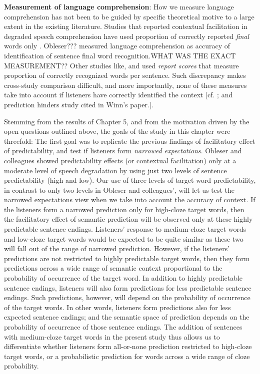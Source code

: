 \documentclass[a4paper, nobind]{templates/ociamthesis}
\begin{document}
\textbf{Measurement of language comprehension}:
How we measure language comprehension has not been to be guided by specific theoretical motive to a large extent in the existing literature.
Studies that reported contextual facilitation in degraded speech comprehension have used proportion of correctly reported \emph{final} words only \autocite[e.g.,][]{Sheldon2008a}.
Obleser??? measured language comprehension as accuracy of identification of sentence final word recognition.WHAT WAS THE EXACT MEASUREMENT??
Other studies like, \textcite{Erb2013} and \textcite{Hakonen2017} used \emph{report scores} \autocite{Peelle2013} that measure proportion of correctly recognized words per sentence.
Such discrepancy makes cross-study comparison difficult,
and more importantly, none of these measures take into account if listeners have correctly identified the context {[}cf. \textcite{Amichetti2018}; and prediction hinders study cited in Winn's paper.{]}.

Stemming from the results of Chapter 5, and from the motivation driven by the open questions outlined above, the goals of the study in this chapter were threefold:
The first goal was to replicate the previous findings of facilitatory effect of predictability, and test if listeners form \emph{narrowed expectations}.
Obleser and colleagues showed predictability effects (or contextual facilitation) only at a moderate level of speech degradation by using just two levels of sentence predictability (high and low).
Our use of three levels of target-word predictability, in contrast to only two levels in Obleser and colleagues', will let us test the narrowed expectations view when we take into account the accuracy of context.
If the listeners form a narrowed prediction only for high-cloze target words, then the facilitatory effect of semantic prediction will be observed only at these highly predictable sentence endings.
Listeners' response to medium-cloze target words and low-cloze target words would be expected to be quite similar as these two will fall out of the range of narrowed prediction.
However, if the listeners' predictions are not restricted to highly predictable target words, then they form predictions across a wide range of semantic context proportional to the probability of occurrence of the target word.
In addition to highly predictable sentence endings, listeners will also form predictions for less predictable sentence endings.
Such predictions, however, will depend on the probability of occurrence of the target words.
In other words, listeners form predictions also for less expected sentence endings;
and the semantic space of prediction depends on the probability of occurrence of those sentence endings.
The addition of sentences with medium-cloze target words in the present study thus allows us to differentiate whether listeners form all-or-none prediction restricted to high-cloze target words, or a probabilistic prediction for words across a wide range of cloze probability.
\end{document}
